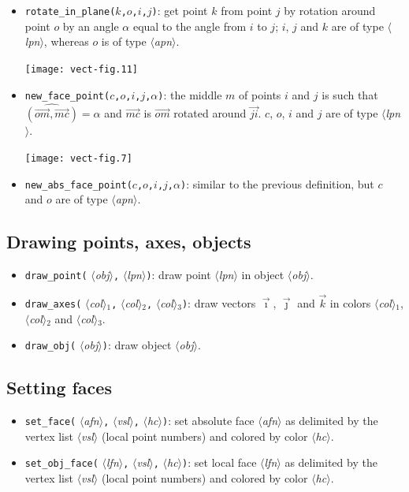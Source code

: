 \documentclass[nonumber,harvardcite]{ltugboat}
\DeclareRobustCommand\meta[1]{%
       \ensuremath{\langle}\emph{#1}\ensuremath{\rangle}}
\newcommand{\APN}{\meta{apn}}
\newcommand{\LPN}{\meta{lpn}}
\newcommand{\AFN}{\meta{afn}}
\newcommand{\LFN}{\meta{lfn}}
\newcommand{\IN}{\meta{obj}}
\newcommand{\VSL}{\meta{vsl}}
\newcommand{\HEXCOL}{\meta{hc}}
\newcommand{\COL}{\meta{col}}
\newcommand{\tc}{\texttt{,}}
\begin{document}
\begin{itemize}
\item \verb|rotate_in_plane(|$k$\tc$o$\tc$i$\tc$j$\verb|)|:
get point $k$ from point $j$ by rotation 
around point $o$ by an angle $\alpha$ equal to the angle from $i$ to $j$;
$i$, $j$ and $k$ are of type \LPN, whereas $o$ is of type \APN.

\begin{center}
  \texttt{[image: vect-fig.11]}
\end{center}

\item \verb|new_face_point(|$c$\tc$o$\tc$i$\tc$j$\tc$\alpha$\verb|)|:
the middle $m$ of points $i$ and $j$ is such that
$\widehat{(\overrightarrow{om},\overrightarrow{mc})}=\alpha$
and $\overrightarrow{mc}$ is $\overrightarrow{om}$ rotated around
$\overrightarrow{ji}$. $c$, $o$, $i$ and $j$ are of type \LPN.

\begin{center}
  \texttt{[image: vect-fig.7]}
\end{center}

\item \verb|new_abs_face_point(|$c$\tc$o$\tc$i$\tc$j$\tc$\alpha$\verb|)|:
similar to the previous definition, but $c$ and $o$ are of type \APN.

\end{itemize}

\subsection{Drawing points, axes, objects}

\begin{itemize}
\item \verb|draw_point(|\IN\tc\LPN\verb|)|: draw point \LPN{} in
     object \IN.
\item \verb|draw_axes(|\COL$_1$\tc\COL$_2$\tc\COL$_3$\verb|)|: 
    draw vectors $\vec\imath$, $\vec\jmath$ and $\vec{k}$ in colors
    \COL$_1$, \COL$_2$ and \COL$_3$.
\item \verb|draw_obj(|\IN\verb|)|: draw object \IN.
\end{itemize}

\subsection{Setting faces}

\begin{itemize}
\item \verb|set_face(|\AFN\tc\VSL\tc\HEXCOL\verb|)|: 
set absolute face \AFN{} as
delimited by the vertex list \VSL{} (local point numbers) and colored by
color \HEXCOL.
\item \verb|set_obj_face(|\LFN\tc\VSL\tc\HEXCOL\verb|)|: 
set local face \LFN{} as
delimited by the vertex list \VSL{} (local point numbers) and colored by
color \HEXCOL. 

\end{itemize}
\end{document}
